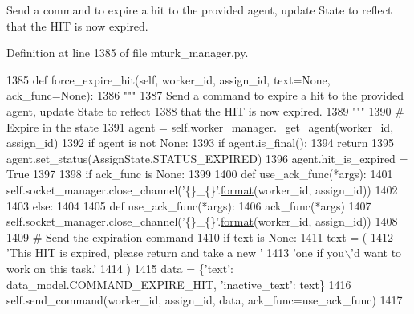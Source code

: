 \begin{DoxyVerb}Send a command to expire a hit to the provided agent, update State to reflect
that the HIT is now expired.
\end{DoxyVerb}
 

Definition at line 1385 of file mturk\+\_\+manager.\+py.


\begin{DoxyCode}
1385     \textcolor{keyword}{def }force\_expire\_hit(self, worker\_id, assign\_id, text=None, ack\_func=None):
1386         \textcolor{stringliteral}{"""}
1387 \textcolor{stringliteral}{        Send a command to expire a hit to the provided agent, update State to reflect}
1388 \textcolor{stringliteral}{        that the HIT is now expired.}
1389 \textcolor{stringliteral}{        """}
1390         \textcolor{comment}{# Expire in the state}
1391         agent = self.worker\_manager.\_get\_agent(worker\_id, assign\_id)
1392         \textcolor{keywordflow}{if} agent \textcolor{keywordflow}{is} \textcolor{keywordflow}{not} \textcolor{keywordtype}{None}:
1393             \textcolor{keywordflow}{if} agent.is\_final():
1394                 \textcolor{keywordflow}{return}
1395             agent.set\_status(AssignState.STATUS\_EXPIRED)
1396             agent.hit\_is\_expired = \textcolor{keyword}{True}
1397 
1398         \textcolor{keywordflow}{if} ack\_func \textcolor{keywordflow}{is} \textcolor{keywordtype}{None}:
1399 
1400             \textcolor{keyword}{def }use\_ack\_func(*args):
1401                 self.socket\_manager.close\_channel(\textcolor{stringliteral}{'\{\}\_\{\}'}.\hyperlink{namespaceparlai_1_1chat__service_1_1services_1_1messenger_1_1shared__utils_a32e2e2022b824fbaf80c747160b52a76}{format}(worker\_id, assign\_id))
1402 
1403         \textcolor{keywordflow}{else}:
1404 
1405             \textcolor{keyword}{def }use\_ack\_func(*args):
1406                 ack\_func(*args)
1407                 self.socket\_manager.close\_channel(\textcolor{stringliteral}{'\{\}\_\{\}'}.\hyperlink{namespaceparlai_1_1chat__service_1_1services_1_1messenger_1_1shared__utils_a32e2e2022b824fbaf80c747160b52a76}{format}(worker\_id, assign\_id))
1408 
1409         \textcolor{comment}{# Send the expiration command}
1410         \textcolor{keywordflow}{if} text \textcolor{keywordflow}{is} \textcolor{keywordtype}{None}:
1411             text = (
1412                 \textcolor{stringliteral}{'This HIT is expired, please return and take a new '}
1413                 \textcolor{stringliteral}{'one if you\(\backslash\)'d want to work on this task.'}
1414             )
1415         data = \{\textcolor{stringliteral}{'text'}: data\_model.COMMAND\_EXPIRE\_HIT, \textcolor{stringliteral}{'inactive\_text'}: text\}
1416         self.send\_command(worker\_id, assign\_id, data, ack\_func=use\_ack\_func)
1417 
\end{DoxyCode}
